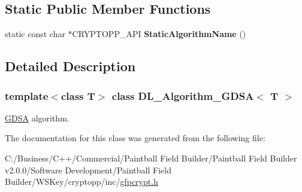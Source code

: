 \subsection*{Static Public Member Functions}
\begin{DoxyCompactItemize}
\item 
\hypertarget{class_d_l___algorithm___g_d_s_a_ae3438205ff307aa3f0944cc29bb98d5a}{
static const char $\ast$CRYPTOPP\_\-API {\bfseries StaticAlgorithmName} ()}
\label{class_d_l___algorithm___g_d_s_a_ae3438205ff307aa3f0944cc29bb98d5a}

\end{DoxyCompactItemize}


\subsection{Detailed Description}
\subsubsection*{template$<$class T$>$ class DL\_\-Algorithm\_\-GDSA$<$ T $>$}

\hyperlink{struct_g_d_s_a}{GDSA} algorithm. 

The documentation for this class was generated from the following file:\begin{DoxyCompactItemize}
\item 
C:/Business/C++/Commercial/Paintball Field Builder/Paintball Field Builder v2.0.0/Software Development/Paintball Field Builder/WSKey/cryptopp/inc/\hyperlink{gfpcrypt_8h}{gfpcrypt.h}\end{DoxyCompactItemize}
